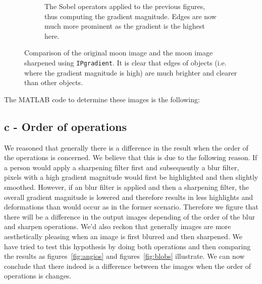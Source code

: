 \begin{figure}[!Hbt]
\begin{subfigure}[b]{0.45\textwidth}
  \caption{The Sobel operators applied to the previous figures, thus computing the gradient magnitude. Edges are now much more prominent as the gradient is the highest here.}
  \label{fig:moonSharp}
 \end{subfigure}
 \caption{Comparison of the original moon image and the moon image sharpened using \texttt{IPgradient}. It is clear that edges of objects (i.e. where the gradient magnitude is high) are much brighter and clearer than other objects.}
 \label{fig:moon}
\end{figure}
The MATLAB code to determine these images is the following:

\subsection*{c - Order of operations}
We reasoned that generally there is a difference in the result when the order of the operations is concerned. We believe that this is due to the following reason. If a person would apply a sharpening filter first and subsequently a blur filter, pixels with a high gradient magnitude would first be highlighted and then slightly smoothed. However, if an blur filter is applied and then a sharpening filter, the overall gradient magnitude is lowered and therefore results in less highlights and deformations than would occur as in the former scenario. \newline
Therefore we figure that there will be a difference in the output images depending of the order of the blur and sharpen operations. We'd also reckon that generally images are more aesthetically pleasing when an image is first blurred and then sharpened. \newline 
We have tried to test this hypothesis by doing both operations and then comparing the results as figures~\ref{fig:angios} and figures~\ref{fig:blobs} illustrate. We can now conclude that there indeed is a difference between the images when the order of operations is changes. 
